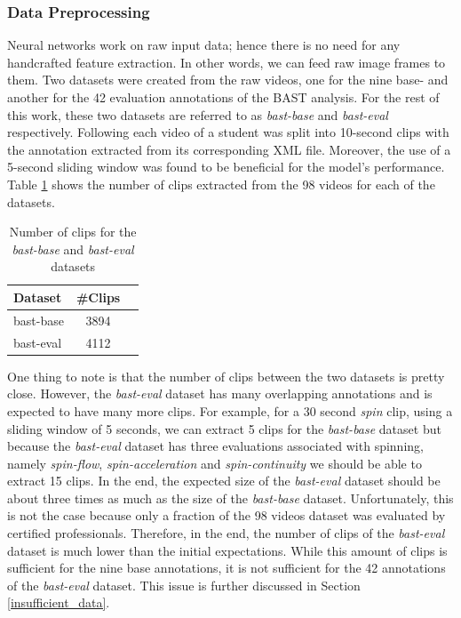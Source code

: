 \documentclass[extern,palatino]{cgMA}
\begin{document}
\subsubsection{Data Preprocessing} Neural networks work on raw input data; hence there is no need for any handcrafted feature extraction. In other words, we can feed raw image frames to them. Two datasets were created from the raw videos, one for the nine base- and another for the 42 evaluation annotations of the BAST analysis. For the rest of this work, these two datasets are referred to as \textit{bast-base} and \textit{bast-eval} respectively. Following \cite{kay2017kinetics} each video of a student was split into 10-second clips with the annotation extracted from its corresponding XML file. Moreover, the use of a 5-second sliding window was found to be beneficial for the model's performance. Table \ref{tab:number_of_clips} shows the number of clips extracted from the 98 videos for each of the datasets.

\begin{table}[h!]
  \begin{center}
    \caption{Number of clips for the \textit{bast-base} and \textit{bast-eval} datasets}
    \label{tab:number_of_clips}
    \begin{tabular}{l|c|r}
      \textbf{Dataset} & \textbf{\#Clips}\\
      \hline
      bast-base & 3894\\
      bast-eval & 4112\\
    \end{tabular}
  \end{center}
\end{table}

\noindent One thing to note is that the number of clips between the two datasets is pretty close. However, the \textit{bast-eval} dataset has many overlapping annotations and is expected to have many more clips. For example, for a 30 second \textit{spin} clip, using a sliding window of 5 seconds, we can extract 5 clips for the \textit{bast-base} dataset but because the \textit{bast-eval} dataset has three evaluations associated with spinning, namely \textit{spin-flow}, \textit{spin-acceleration} and \textit{spin-continuity} we should be able to extract 15 clips. In the end, the expected size of the \textit{bast-eval} dataset should be about three times as much as the size of the \textit{bast-base} dataset. Unfortunately, this is not the case because only a fraction of the 98 videos dataset was evaluated by certified professionals. Therefore, in the end, the number of clips of the \textit{bast-eval} dataset is much lower than the initial expectations. While this amount of clips is sufficient for the nine base annotations, it is not sufficient for the 42 annotations of the \textit{bast-eval} dataset. This issue is further discussed in Section \ref{insufficient_data}.
\end{document}
